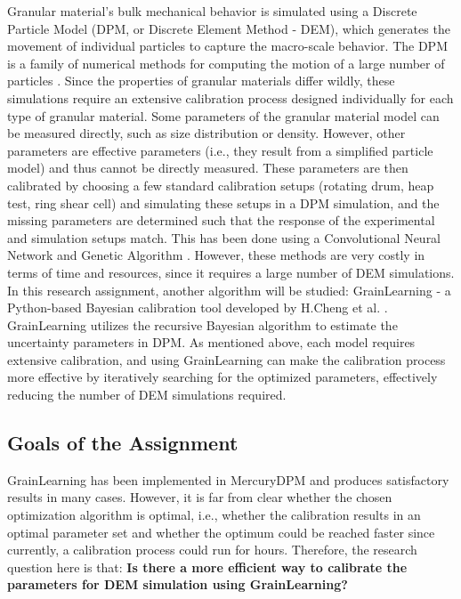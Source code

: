 \documentclass[../BachelorAssignment.tex]{subfiles}
\begin{document}
Granular material's bulk mechanical behavior is simulated using a Discrete Particle Model (DPM, or Discrete Element Method - DEM), which generates the movement of individual particles to capture the macro-scale behavior. The DPM is a family of numerical methods for computing the motion of a large number of particles \cite{Weng:2015}. Since the properties of granular materials differ wildly, these simulations require an extensive calibration process designed individually for each type of granular material. Some parameters of the granular material model can be measured directly, such as size distribution or density. However, other parameters are effective parameters (i.e., they result from a simplified particle model) and thus cannot be directly measured. These parameters are then calibrated by choosing a few standard calibration setups (rotating drum, heap test, ring shear cell) and simulating these setups in a DPM simulation, and the missing parameters are determined such that the response of the experimental and simulation setups match. This has been done using a Convolutional Neural Network \cite{nn-calibration} and Genetic Algorithm \cite{ga-calibration}. However, these methods are very costly in terms of  time and resources, since it requires a large number of DEM simulations. In this research assignment, another algorithm will be studied: GrainLearning - a Python-based Bayesian calibration tool developed by H.Cheng et al. \cite{grainLearning}. GrainLearning utilizes the recursive Bayesian algorithm to estimate the uncertainty parameters in DPM. As mentioned above, each model requires extensive calibration, and using GrainLearning can make the calibration process more effective by iteratively searching for the optimized parameters, effectively reducing the number of DEM simulations required.

\subsection{Goals of the Assignment}

GrainLearning has been implemented in MercuryDPM and produces satisfactory results in many cases. However, it is far from clear whether the chosen optimization algorithm is optimal, i.e., whether the calibration results in an optimal parameter set and whether the optimum could be reached faster since currently, a calibration process could run for hours. Therefore, the research question here is that: \textbf{Is there a more efficient way to calibrate the parameters for DEM simulation using GrainLearning?} 
\end{document}
